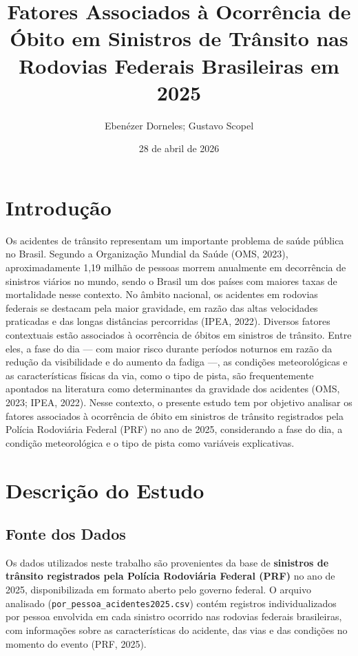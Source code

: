 \documentclass[
  brazilian,
  12pt,
]{article}
\title{Fatores Associados à Ocorrência de Óbito em Sinistros de Trânsito
nas Rodovias Federais Brasileiras em 2025}
\author{Ebenézer Dorneles; Gustavo Scopel}
\date{28 de abril de 2026}
\begin{document}
\maketitle

{
\setcounter{tocdepth}{3}
\tableofcontents
}
\newpage

\section{Introdução}\label{introduuxe7uxe3o}

Os acidentes de trânsito representam um importante problema de saúde
pública no Brasil. Segundo a Organização Mundial da Saúde (OMS, 2023),
aproximadamente 1,19 milhão de pessoas morrem anualmente em decorrência
de sinistros viários no mundo, sendo o Brasil um dos países com maiores
taxas de mortalidade nesse contexto. No âmbito nacional, os acidentes em
rodovias federais se destacam pela maior gravidade, em razão das altas
velocidades praticadas e das longas distâncias percorridas (IPEA, 2022).
Diversos fatores contextuais estão associados à ocorrência de óbitos em
sinistros de trânsito. Entre eles, a fase do dia --- com maior risco
durante períodos noturnos em razão da redução da visibilidade e do
aumento da fadiga ---, as condições meteorológicas e as características
físicas da via, como o tipo de pista, são frequentemente apontados na
literatura como determinantes da gravidade dos acidentes (OMS, 2023;
IPEA, 2022). Nesse contexto, o presente estudo tem por objetivo analisar
os fatores associados à ocorrência de óbito em sinistros de trânsito
registrados pela Polícia Rodoviária Federal (PRF) no ano de 2025,
considerando a fase do dia, a condição meteorológica e o tipo de pista
como variáveis explicativas.

\section{Descrição do Estudo}\label{descriuxe7uxe3o-do-estudo}

\subsection{Fonte dos Dados}\label{fonte-dos-dados}

Os dados utilizados neste trabalho são provenientes da base de
\textbf{sinistros de trânsito registrados pela Polícia Rodoviária
Federal (PRF)} no ano de 2025, disponibilizada em formato aberto pelo
governo federal. O arquivo analisado
(\texttt{por\_pessoa\_acidentes2025.csv}) contém registros
individualizados por pessoa envolvida em cada sinistro ocorrido nas
rodovias federais brasileiras, com informações sobre as características
do acidente, das vias e das condições no momento do evento (PRF, 2025).
\end{document}
